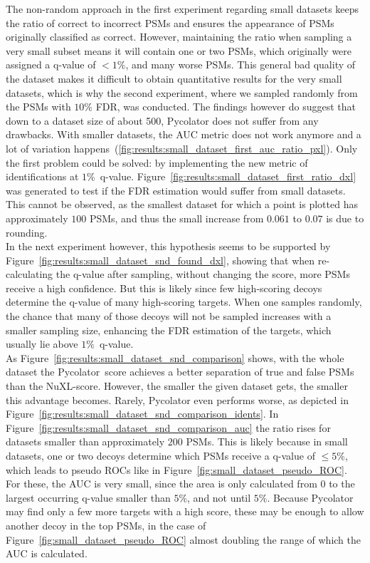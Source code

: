 The non-random approach in the first experiment regarding small datasets keeps the ratio of correct to incorrect PSMs and ensures the appearance of PSMs originally classified as correct. However, maintaining the ratio when sampling a very small subset means it will contain one or two PSMs, which originally were assigned a q-value of $<1\%$, and many worse PSMs. This general bad quality of the dataset makes it difficult to obtain quantitative results for the very small datasets, which is why the second experiment, where we sampled randomly from the PSMs with $10\%$ FDR, was conducted. The findings however do suggest that down to a dataset size of about 500, Pycolator does not suffer from any drawbacks. With smaller datasets, the AUC metric does not work anymore and a lot of variation happens~(\ref{fig:results:small_dataset_first_auc_ratio_pxl}). Only the first problem could be solved: by implementing the new metric of identifications at $1\%$~q-value. Figure~\ref{fig:results:small_dataset_first_ratio_dxl} was generated to test if the FDR estimation would suffer from small datasets. This cannot be observed, as the smallest dataset for which a point is plotted has approximately $100$ PSMs, and thus the small increase from $0.061$ to $0.07$ is due to rounding.\\
In the next experiment however, this hypothesis seems to be supported by Figure~\ref{fig:results:small_dataset_snd_found_dxl}, showing that when re-calculating the q-value after sampling, without changing the score, more PSMs receive a high confidence. But this is likely since few high-scoring decoys determine the q-value of many high-scoring targets. When one samples randomly, the chance that many of those decoys will not be sampled increases with a smaller sampling size, enhancing the FDR estimation of the targets, which usually lie above $1\%$~q-value.\\
As Figure~\ref{fig:results:small_dataset_snd_comparison} shows, with the whole dataset the Pycolator~score achieves a better separation of true and false PSMs than the NuXL-score. However, the smaller the given dataset gets, the smaller this advantage becomes. Rarely, Pycolator even performs worse, as depicted in Figure~\ref{fig:results:small_dataset_snd_comparison_idents}. In Figure~\ref{fig:results:small_dataset_snd_comparison_auc} the ratio rises for datasets smaller than approximately $200$ PSMs. This is likely because in small datasets, one or two decoys determine which PSMs receive a q-value of $\leq5\%$, which leads to pseudo ROCs like in Figure~\ref{fig:small_dataset_pseudo_ROC}. For these, the AUC is very small, since the area is only calculated from $0$ to the largest occurring q-value smaller than $5\%$, and not until $5\%$. Because Pycolator may find only a few more targets with a high score, these may be enough to allow another decoy in the top PSMs, in the case of Figure~\ref{fig:small_dataset_pseudo_ROC} almost doubling the range of which the AUC is calculated.\\
